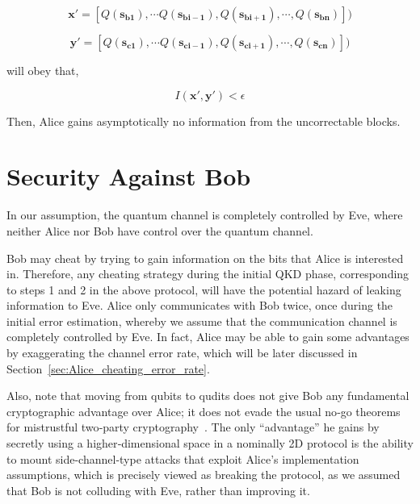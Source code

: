 \documentclass[%
 reprint,
superscriptaddress,
 amsmath,amssymb,
 aps,
]{revtex4-2}
\begin{document}
\begin{equation}
    \mathbf{x'}=[Q(\mathbf{s_{b1}}), \cdots Q(\mathbf{s_{bi-1}}), Q(\mathbf{s_{bi+1}}), \cdots, Q(\mathbf{s_{bn}}) ])
\end{equation}

\begin{equation}
    \mathbf{y'}=[Q(\mathbf{s_{c1}}), \cdots Q(\mathbf{s_{ci-1}}), Q(\mathbf{s_{ci+1}}), \cdots, Q(\mathbf{s_{cn}}) ])
\end{equation}

will obey that,

\begin{equation}
    I(\mathbf{x'}, \mathbf{y'})<\epsilon
\end{equation}

Then, Alice gains asymptotically no information from the uncorrectable blocks.


\section{Security Against Bob}

In our assumption, the quantum channel is completely controlled by Eve, where neither Alice nor Bob have control over the quantum channel.

Bob may cheat by trying to gain information on the bits that Alice is interested in. Therefore, any cheating strategy during the initial QKD phase, corresponding to steps 1 and 2 in the above protocol, will have the potential hazard of leaking information to Eve. Alice only communicates with Bob twice, once during the initial error estimation, whereby we assume that the communication channel is completely controlled by Eve. In fact, Alice may be able to gain some advantages by exaggerating the channel error rate, which will be later discussed in Section~\ref{sec:Alice_cheating_error_rate}. 

Also, note that moving from qubits to qudits does not give Bob any fundamental cryptographic advantage over Alice; it does not evade the usual no‑go theorems for mistrustful two‑party cryptography~\cite{Multiphoton_side_channel_attack1, Multiphoton_side_channel_attack2}. The only ``advantage'' he gains by secretly using a higher‑dimensional space in a nominally 2D protocol is the ability to mount side-channel-type attacks that exploit Alice’s implementation assumptions, which is precisely viewed as breaking the protocol, as we assumed that Bob is not colluding with Eve, rather than improving it.
\end{document}
